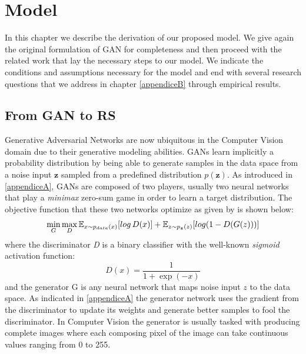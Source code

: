 \chapter{Model}
\label{model}
\thispagestyle{empty}

In this chapter we describe the derivation of our proposed model. We give again the original formulation of GAN for completeness and then proceed with the related work that lay the necessary steps to our model. We indicate the conditions and assumptions necessary for the model and end with several research questions that we address in chapter \ref{appendiceB} through empirical results.

\section{From GAN to RS}
\label{from_gan_to_rs}
Generative Adversarial Networks \cite{goodfellow2014generative} are now ubiquitous in the Computer Vision domain due to their generative modeling abilities. GANs learn implicitly a probability distribution by being able to generate samples in the data space from a noise input $\textbf{z}$ sampled from a predefined distribution $p(\textbf{z})$. As introduced in \ref{appendiceA}, GANs are composed of two players, usually two neural networks that play a \emph{minimax} zero-sum game in order to learn a target distribution. The objective function that these two networks optimize as given by \cite{goodfellow2014generative} is shown below:
\[
    \min_{G} \max_{D} \operatorname{\mathbb{E}}_{x\sim{p_{data}(x)}} [log \, D(x)] + \operatorname{\mathbb{E}}_{z\sim{p_{\boldsymbol{z}}(z)}} [log(1-D(G(z)))]
\]
where the discriminator \emph{D} is a binary classifier with the well-known \emph{sigmoid} activation function:
\[
    D(x) = \frac{1}{1 + \exp(-x)}
\]
and the generator G is any neural network that maps noise input $z$ to the data space. As indicated in \ref{appendiceA} the generator network uses the gradient from the discriminator to update its weights and generate better samples to fool the discriminator. In Computer Vision the generator is usually tasked with producing complete images where each composing pixel of the image can take continuous values ranging from 0 to 255.

